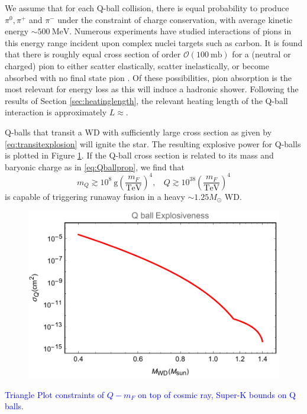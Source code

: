 \documentclass[twocolumn,showpacs,preprintnumbers,amsmath,amssymb,prd]{revtex4}
\newcommand{\OO}{\mathcal{O}}
\def\r{\right)}
\def\l{\left(}
\begin{document}
We assume that for each Q-ball collision, there is equal probability to produce $\pi^0, \pi^+$ and $\pi^-$ under the constraint of charge conservation, with average kinetic energy $\sim 500 ~\text{MeV}$. Numerous experiments have studied interactions of pions in this energy range incident upon complex nuclei targets such as carbon. It is found that there is roughly equal cross section of order $\OO (100 ~\text{mb})$ for a (neutral or charged) pion to either scatter elastically, scatter inelastically, or become absorbed with no final state pion \cite{Pionnuclear}. Of these possibilities, pion absorption is the most relevant for energy loss as this will induce a hadronic shower. Following the results of Section \ref{sec:heatinglength}, the relevant heating length of the Q-ball interaction is approximately $L \approx$. 

Q-balls that transit a WD with sufficiently large cross section as given by \eqref{eq:transitexplosion} will ignite the star. The resulting explosive power for Q-balls is plotted in Figure \ref{fig:boomQball}. If the Q-ball cross section is related to its mass and baryonic charge as in \eqref{eq:Qballprop}, we find that
\begin{equation}
m_Q \gtrsim 10^8 ~\text{g} \l\frac{m_F}{\text{TeV}}\r^4, ~~~~ Q \gtrsim 10^{38} \l\frac{m_F}{\text{TeV}}\r^4
\end{equation}
is capable of triggering runaway fusion in a heavy $\sim 1.25 M_{\odot}$ WD.

\begin{figure}
\label{fig:boomQball}
\includegraphics[scale=.45]{boomQball.pdf}
\end{figure}

\textcolor{blue}{Triangle Plot constraints of $Q - m_F$ on top of cosmic ray, Super-K bounds on Q balls}.
\end{document}
